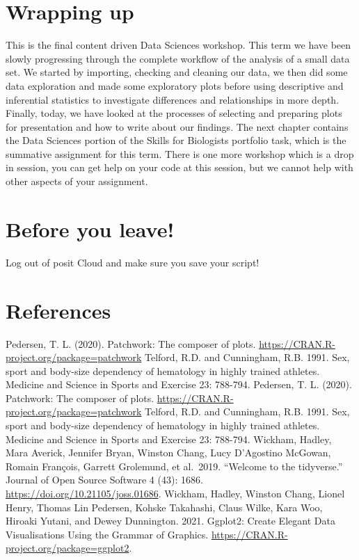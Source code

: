 \documentclass[
]{book}
\begin{document}
\hypertarget{wrapping-up-2}{%
\section{Wrapping up}\label{wrapping-up-2}}

This is the final content driven Data Sciences workshop. This term we have been slowly progressing through the complete workflow of the analysis of a small data set. We started by importing, checking and cleaning our data, we then did some data exploration and made some exploratory plots before using descriptive and inferential statistics to investigate differences and relationships in more depth. Finally, today, we have looked at the processes of selecting and preparing plots for presentation and how to write about our findings. The next chapter contains the Data Sciences portion of the Skills for Biologists portfolio task, which is the summative assignment for this term. There is one more workshop which is a drop in session, you can get help on your code at this session, but we cannot help with other aspects of your assignment.

\hypertarget{before-you-leave-9}{%
\section{Before you leave!}\label{before-you-leave-9}}

Log out of posit Cloud and make sure you save your script!

\hypertarget{references-10}{%
\section{References}\label{references-10}}

Pedersen, T. L. (2020). Patchwork: The composer of plots. \url{https://CRAN.R-project.org/package=patchwork}
Telford, R.D. and Cunningham, R.B. 1991. Sex, sport and body-size dependency of hematology in highly trained athletes. Medicine and Science in Sports and Exercise 23: 788-794. Pedersen, T. L. (2020). Patchwork: The composer of plots. \url{https://CRAN.R-project.org/package=patchwork}
Telford, R.D. and Cunningham, R.B. 1991. Sex, sport and body-size dependency of hematology in highly trained athletes. Medicine and Science in Sports and Exercise 23: 788-794.
Wickham, Hadley, Mara Averick, Jennifer Bryan, Winston Chang, Lucy D'Agostino McGowan, Romain François, Garrett Grolemund, et al.~2019. ``Welcome to the tidyverse.'' Journal of Open Source Software 4 (43): 1686. \url{https://doi.org/10.21105/joss.01686}.
Wickham, Hadley, Winston Chang, Lionel Henry, Thomas Lin Pedersen, Kohske Takahashi, Claus Wilke, Kara Woo, Hiroaki Yutani, and Dewey Dunnington. 2021. Ggplot2: Create Elegant Data Visualisations Using the Grammar of Graphics. \url{https://CRAN.R-project.org/package=ggplot2}.
\end{document}
